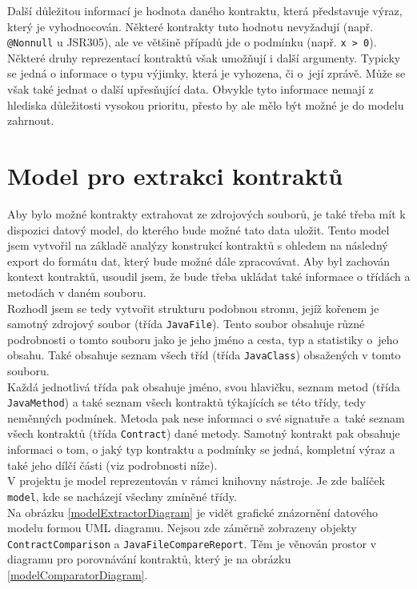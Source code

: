 		Další důležitou informací je hodnota daného kontraktu, která představuje výraz, který je vyhodnocován. Některé kontrakty tuto hodnotu nevyžadují (např. \texttt{@Nonnull} u JSR305), ale ve většině případů jde o podmínku (např. \texttt{x~> 0}). Některé druhy reprezentací kontraktů však umožňují i další argumenty. Typicky se jedná o informace o typu výjimky, která je vyhozena, či o~její zprávě. Může se však také jednat o další upřesňující data. Obvykle tyto informace nemají z hlediska důležitosti vysokou prioritu, přesto by ale mělo být možné je do modelu zahrnout.
		
	
	\section{Model pro extrakci kontraktů}
			Aby bylo možné kontrakty extrahovat ze zdrojových souborů, je také třeba mít k dispozici datový model, do kterého bude možné tato data uložit. Tento model jsem vytvořil na základě analýzy konstrukcí kontraktů s ohledem na následný export do formátu dat, který bude možné dále zpracovávat. Aby byl zachován kontext kontraktů, usoudil jsem, že bude třeba ukládat také informace o třídách a metodách v daném souboru.\\
			
			Rozhodl jsem se tedy vytvořit strukturu podobnou stromu, jejíž kořenem je samotný zdrojový soubor (třída \texttt{JavaFile}). Tento soubor obsahuje různé podrobnosti o tomto souboru jako je jeho jméno a cesta, typ a statistiky o~jeho obsahu. Také obsahuje seznam všech tříd (třída \texttt{JavaClass}) obsažených v tomto souboru.\\
			
			Každá jednotlivá třída pak obsahuje jméno, svou hlavičku, seznam metod (třída \texttt{JavaMethod}) a také seznam všech kontraktů týkajících se této třídy, tedy neměnných podmínek. Metoda pak nese informaci o své signatuře a~také seznam všech kontraktů (třída \texttt{Contract}) dané metody. Samotný kontrakt pak obsahuje informaci o tom, o jaký typ kontraktu a podmínky se jedná, kompletní výraz a také jeho dílčí části (viz podrobnosti níže).\\
			
			V projektu je model reprezentován v rámci knihovny nástroje. Je zde balíček \texttt{model}, kde se nacházejí všechny zmíněné třídy.\\
			
			Na obrázku \ref{modelExtractorDiagram} je vidět grafické znázornění datového modelu formou UML diagramu. Nejsou zde záměrně zobrazeny objekty \texttt{ContractComparison} a \texttt{JavaFileCompareReport}. Těm je věnován prostor v diagramu pro porovnávání kontraktů, který je na obrázku \ref{modelComparatorDiagram}.\\ 
							
